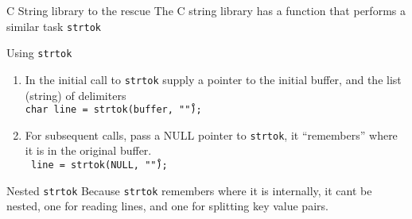 \documentclass[xcolor=svgnames]{beamer}
\begin{document}
\begin{frame}[fragile]{C String library to the rescue}
The C string library has a function that performs a similar task \texttt{strtok}

\begin{block}{Using \texttt{strtok}}
\begin{enumerate}
    \item In the initial call to \texttt{strtok} supply a pointer to the initial buffer, and the list (string) of delimiters\\
    \hfill\texttt{char line = strtok(buffer, "\n\r");}
    \item For subsequent calls, pass a NULL pointer to \texttt{strtok}, it ``remembers'' where it is in the original buffer.\\
    \hfill\texttt{ line = strtok(NULL, "\n\r");}
\end{enumerate}
\end{block}

\begin{alertblock}{Nested \texttt{strtok}}
Because \texttt{strtok} remembers where it is internally, it cant be nested, one for reading lines, and one for splitting key value pairs.
\end{alertblock}
\end{frame}
\end{document}

